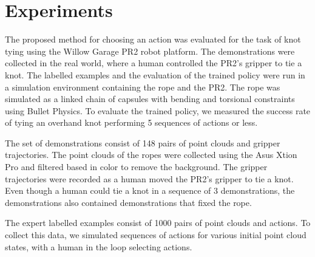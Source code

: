 \section{Experiments}

The proposed method for choosing an action was evaluated for the task of knot tying using the Willow Garage PR2 robot platform. 
The demonstrations were collected in the real world, where a human controlled the PR2's gripper to tie a knot.
The labelled examples and the evaluation of the trained policy were run in a simulation environment containing the rope and the PR2.
The rope was simulated as a linked chain of capsules with bending and torsional constraints using Bullet Physics.
To evaluate the trained policy, we measured the success rate of tying an overhand knot performing 5 sequences of actions or less.

The set of demonstrations consist of 148 pairs of point clouds and gripper trajectories.
The point clouds of the ropes were collected using the Asus Xtion Pro and filtered based in color to remove the background.
The gripper trajectories were recorded as a human moved the PR2's gripper to tie a knot.
Even though a human could tie a knot in a sequence of 3 demonstrations, the demonstrations also contained demonstrations that fixed the rope.

The expert labelled examples consist of 1000 pairs of point clouds and actions.
To collect this data, we simulated sequences of actions for various initial point cloud states, with a human in the loop selecting actions.

